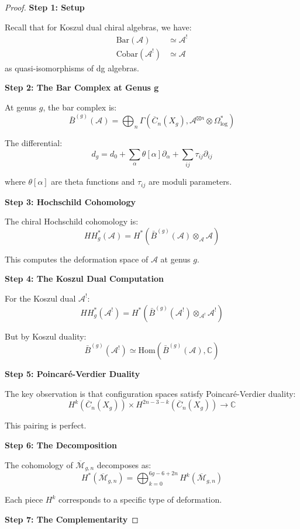 \begin{proof}
\textbf{Step 1: Setup}

Recall that for Koszul dual chiral algebras, we have:
\begin{align}
\text{Bar}(\mathcal{A}) &\simeq \mathcal{A}^! \\
\text{Cobar}(\mathcal{A}^!) &\simeq \mathcal{A}
\end{align}
as quasi-isomorphisms of dg algebras.

\textbf{Step 2: The Bar Complex at Genus g}

At genus $g$, the bar complex is:
$$\bar{B}^{(g)}(\mathcal{A}) = \bigoplus_n \Gamma(\overline{C}_n(X_g), \mathcal{A}^{\boxtimes n} \otimes \Omega^*_{\log})$$

The differential:
$$d_g = d_0 + \sum_{\alpha} \theta[\alpha] \partial_\alpha + \sum_{ij} \tau_{ij} \partial_{ij}$$

where $\theta[\alpha]$ are theta functions and $\tau_{ij}$ are moduli parameters.

\textbf{Step 3: Hochschild Cohomology}

The chiral Hochschild cohomology is:
$$HH^*_g(\mathcal{A}) = H^*(\bar{B}^{(g)}(\mathcal{A}) \otimes_{\mathcal{A}} \mathcal{A})$$

This computes the deformation space of $\mathcal{A}$ at genus $g$.

\textbf{Step 4: The Koszul Dual Computation}

For the Koszul dual $\mathcal{A}^!$:
$$HH^*_g(\mathcal{A}^!) = H^*(\bar{B}^{(g)}(\mathcal{A}^!) \otimes_{\mathcal{A}^!} \mathcal{A}^!)$$

But by Koszul duality:
$$\bar{B}^{(g)}(\mathcal{A}^!) \simeq \text{Hom}(\bar{B}^{(g)}(\mathcal{A}), \mathbb{C})$$

\textbf{Step 5: Poincaré-Verdier Duality}

The key observation is that configuration spaces satisfy Poincaré-Verdier duality:
$$H^k(\overline{C}_n(X_g)) \times H^{2n-3-k}(\overline{C}_n(X_g)) \to \mathbb{C}$$

This pairing is perfect.

\textbf{Step 6: The Decomposition}

The cohomology of $\overline{\mathcal{M}}_{g,n}$ decomposes as:
$$H^*(\overline{\mathcal{M}}_{g,n}) = \bigoplus_{k=0}^{6g-6+2n} H^k(\overline{\mathcal{M}}_{g,n})$$

Each piece $H^k$ corresponds to a specific type of deformation.

\textbf{Step 7: The Complementarity}


\end{proof}
